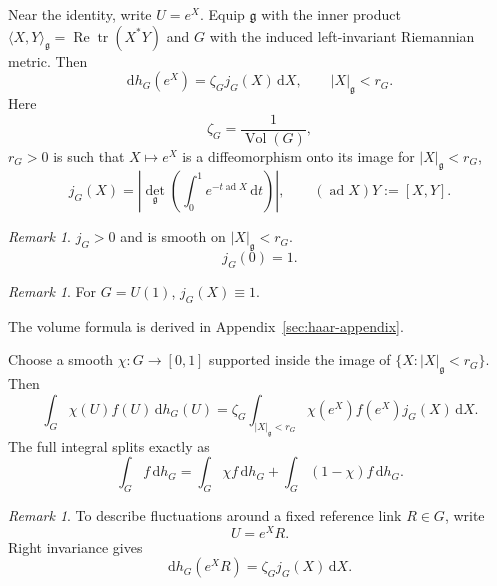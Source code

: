 \documentclass[10pt,reqno]{amsart}
\theoremstyle{definition}
\theoremstyle{remark}
\newtheorem{remark}[definition]{Remark}
\numberwithin{equation}{section}
\numberwithin{figure}{section}
\newcommand{\g}{\mathfrak g}
\newcommand{\dd}{\mathrm d}
\DeclareMathOperator{\ad}{ad}
\DeclareMathOperator{\tr}{tr}
\DeclareMathOperator{\Vol}{Vol}
\begin{document}
Near the identity, write $U=e^X$. Equip $\g$ with the inner product $\langle X,Y\rangle_\g=\operatorname{Re}\tr(X^*Y)$ and $G$ with the induced left-invariant Riemannian metric. Then
\begin{equation}\label{eq:display-076}
\boxed{
\dd h_G(e^X)=\zeta_Gj_G(X)\,\dd X,\qquad |X|_{\g}<r_G.
}
\end{equation}
Here
\begin{equation}\label{eq:display-077}
\zeta_G=\frac1{\Vol(G)},
\end{equation}
$r_G>0$ is such that $X\mapsto e^X$ is a diffeomorphism onto its image for $|X|_\g<r_G$,
\begin{equation}\label{eq:display-078}
j_G(X)=\left|\det_{\g}\left(\int_0^1e^{-t\ad X}\,\dd t\right)\right|,
\qquad(\ad X)Y:=[X,Y].
\end{equation}
\begin{remark} $j_G>0$ and is smooth on $|X|_\g<r_G$.
\begin{equation}\label{eq:display-079}
j_G(0)=1.
\end{equation}
\end{remark}

\begin{remark} For $G=U(1)$, $j_G(X)\equiv1$.\end{remark}

The volume formula is derived in Appendix~\ref{sec:haar-appendix}.

Choose a smooth $\chi:G\to[0,1]$ supported inside the image of $\{X:|X|_\g<r_G\}$. Then
\begin{equation}\label{eq:display-080}
\int_G\chi(U)f(U)\,\dd h_G(U)
=\zeta_G\int_{|X|_\g<r_G}\chi(e^X)f(e^X)j_G(X)\,\dd X.
\end{equation}
The full integral splits exactly as
\begin{equation}\label{eq:display-081}
\int_Gf\,\dd h_G
=\int_G\chi f\,\dd h_G+\int_G(1-\chi)f\,\dd h_G.
\end{equation}

\begin{remark} To describe fluctuations around a fixed reference link $R\in G$, write
\begin{equation}\label{eq:display-082}
U=e^XR.
\end{equation}
Right invariance gives
\begin{equation}\label{eq:display-083}
\dd h_G(e^XR)=\zeta_Gj_G(X)\,\dd X.
\end{equation}
\end{remark}
\end{document}
